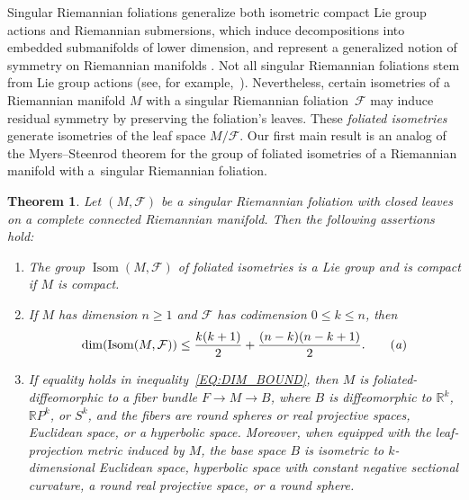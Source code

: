 \documentclass[pdftex]{sigma}
\numberwithin{equation}{section}
\newtheorem{theoremalpha}{Theorem}
\theoremstyle{definition}
\DeclareMathOperator{\Iso}{Isom}
\newcommand{\R}{\mathbb{R}} %
\newcommand{\RP}{\mathbb{R}P} %
\newcommand{\fol}{\mathcal{F}}
\begin{document}
Singular Riemannian foliations generalize both isometric compact Lie group actions and Riemannian submersions, which induce decompositions into embedded submanifolds of lower dimension, and represent a generalized notion of symmetry on Riemannian manifolds \cite{AlexandrinoRadeschi2017, Corro, CorroMoreno2022, GalazGarciaRadeschi2015, Moreno2019}. Not all singular Riemannian foliations stem from Lie group actions
(see, for example,~\cite{Radeschi2014}). Nevertheless, certain isometries of a Riemannian manifold $M$ with a singular Riemannian foliation~$\fol$ may induce residual symmetry by preserving the foliation's leaves. These \emph{foliated isometries} generate isometries of the leaf space $M/\fol$. Our first main result is an analog of the Myers--Steenrod theorem for the group of foliated isometries of a Riemannian manifold with a~singular Riemannian foliation.

\begin{theoremalpha}\label{T:MAIN_THM_SRF}
		Let $(M,\fol)$ be a singular Riemannian foliation with closed leaves on a complete connected Riemannian manifold. Then the following assertions hold:
		\begin{enumerate}[label=$(\roman*)$]\itemsep=0pt
			\item\label{C:MAIN_THM_i} The group $\Iso(M,\fol)$ of foliated isometries is a Lie group and is compact if $M$ is compact.
			\item\label{C:MAIN_THM_ii} If $M$ has dimension $n\geq 1$ and $\fol$ has codimension $0\leq k\leq n$, then
				\begin{equation}
				\dim(\Iso(M,\fol))\leq\frac{k(k+1)}{2} + \frac{(n-k)(n-k+1)}{2}.\tag{\emph{a}}\label{EQ:DIM_BOUND}		
				\end{equation}
			\item\label{C:MAIN_THM_iii} If equality holds in inequality~\eqref{EQ:DIM_BOUND}, then $M$ is foliated-diffeomorphic to a fiber bundle $F\to M\to B$, where $B$ is diffeomorphic to $\R^k$, $\RP^k$, or $S^k$, and the fibers are round spheres or real projective spaces, Euclidean space, or a hyperbolic space. Moreover, when equipped with the leaf-projection metric induced by $M$, the base space $B$ is isometric to $k$-dimensional Euclidean space, hyperbolic space with constant negative sectional curvature, a round real projective space, or a round sphere. 	
		\end{enumerate}
	\end{theoremalpha}
\end{document}
